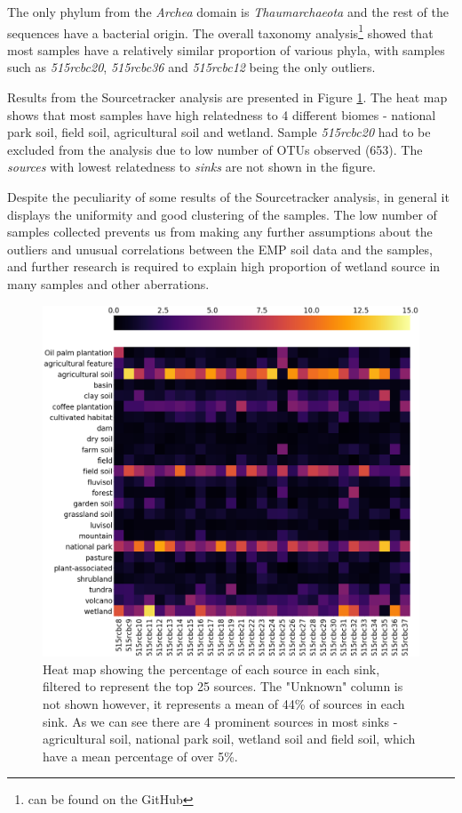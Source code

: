 \documentclass[12pt,twocolumn]{article} %
\begin{document}
\par
The only phylum from the \textit{Archea} domain is \textit{Thaumarchaeota} and the rest of the sequences have a bacterial origin. The overall taxonomy analysis\footnote{can be found on the GitHub\cite{Anonymous2018}} showed that most samples have a relatively similar proportion of various phyla, with samples such as \textit{515rcbc20}, \textit{515rcbc36} and \textit{515rcbc12} being the only outliers.
\par
Results from the Sourcetracker analysis are presented in Figure \ref{fig:Sourcetracker_heatmap}. The heat map shows that most samples have high relatedness to 4 different biomes - national park soil, field soil, agricultural soil and wetland. Sample \textit{515rcbc20} had to be excluded from the analysis due to low number of OTUs observed (653). The \textit{sources} with lowest relatedness to \textit{sinks} are not shown in the figure. 
\par
Despite the peculiarity of some results of the Sourcetracker analysis, in general it displays the uniformity and good clustering of the samples. The low number of samples collected prevents us from making any further assumptions about the outliers and unusual correlations between the EMP soil data and the samples, and further research is required to explain high proportion of wetland source in many samples and other aberrations.
\begin{figure}[ht!] %
	\includegraphics[width=\linewidth]{heatmap_perc.png}
	\caption{Heat map showing the percentage of each source in each sink, filtered to represent the top 25 sources. The "Unknown" column is not shown however, it represents a mean of 44\% of sources in each sink. As we can see there are 4 prominent sources in most sinks - agricultural soil, national park soil, wetland soil and field soil, which have a mean percentage of over 5\%.}
	\label{fig:Sourcetracker_heatmap}
\end{figure}
%
%
\end{document}
